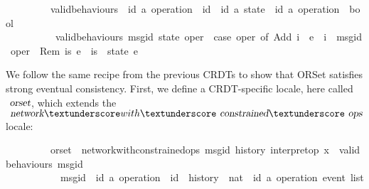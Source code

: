 \vspace{0.35em}
\begin{isabellebody}
\ \ \ \ \ \ \ \ \ valid{\isacharunderscore}behaviours\ {\isacharcolon}{\isacharcolon}\ {\isachardoublequoteopen}{\isacharparenleft}{\isacharparenleft}{\isacharprime}id{\isacharcomma}\ {\isacharprime}a{\isacharparenright}\ operation\ {\isasymRightarrow}\ {\isacharprime}id{\isacharparenright}\ {\isasymRightarrow}\ {\isacharparenleft}{\isacharprime}id{\isacharcomma}\ {\isacharprime}a{\isacharparenright}\ state\ {\isasymRightarrow}\ {\isacharparenleft}{\isacharprime}id{\isacharcomma}\ {\isacharprime}a{\isacharparenright}\ operation\ {\isasymRightarrow}\ bool{\isachardoublequoteclose}\ \isanewline
\ \ \ \ \ \ \ \ \ \ {\isachardoublequoteopen}valid{\isacharunderscore}behaviours\ msg{\isacharunderscore}id\ state\ oper\ {\isasymequiv}\ case\ oper\ of\ Add\ i\ \ e\ {\isasymRightarrow}\ i\ {\isacharequal}\ msg{\isacharunderscore}id\ oper\ {\isacharbar}\ Rem\ is\ e\ {\isasymRightarrow}\ is\ {\isacharequal}\ state\ e{\isachardoublequoteclose}
\end{isabellebody}
\vspace{0.35em}
We follow the same recipe from the previous CRDTs to show that ORSet satisfies
strong eventual consistency. First, we define a CRDT-specific locale, here
called $\isa{orset}$, which extends the
$\isa{network}{\isacharunderscore}with{\isacharunderscore}\isa{constrained}{\isacharunderscore}\isa{ops}$
locale:
\vspace{0.35em}
\begin{isabellebody}
\ \ \ \ \ \ \ \ \ orset\ {\isacharequal}\ network{\isacharunderscore}with{\isacharunderscore}constrained{\isacharunderscore}ops\ msg{\isacharunderscore}id\ history\ interpret{\isacharunderscore}op\ {\isachardoublequoteopen}{\isasymlambda}x{\isachardot}\ {\isacharbraceleft}{\isacharbraceright}{\isachardoublequoteclose}\ {\isachardoublequoteopen}valid{\isacharunderscore}behaviours\ msg{\isacharunderscore}id{\isachardoublequoteclose}\isanewline
\ \ \ \ \ \ \ \ \ \ \ msg{\isacharunderscore}id\ {\isacharcolon}{\isacharcolon}\ {\isachardoublequoteopen}{\isacharparenleft}{\isacharprime}id{\isacharcomma}\ {\isacharprime}a{\isacharparenright}\ operation\ {\isasymRightarrow}\ {\isacharprime}id{\isachardoublequoteclose}\ \ history\ {\isacharcolon}{\isacharcolon}\ {\isachardoublequoteopen}nat\ {\isasymRightarrow}\ {\isacharparenleft}{\isacharprime}id{\isacharcomma}\ {\isacharprime}a{\isacharparenright}\ operation\ event\ list{\isachardoublequoteclose}
\end{isabellebody}
\vspace{0.35em}

